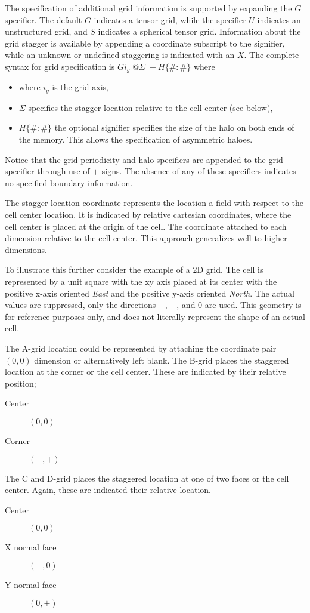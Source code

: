 The specification of additional grid information is supported by expanding the $G$ specifier. The default $G$ indicates a tensor grid, while the specifier $U$ indicates an unstructured grid, and $S$ indicates a spherical tensor grid. Information about the grid stagger is available by appending a coordinate subscript to the signifier, while an unknown or undefined staggering is indicated with an $X$.
The complete syntax for grid specification is $G i_g \; @ \Sigma \; + H \{ \# : \# \}$ where
\begin{itemize}
	\item where $i_g$ is the grid axis,
	\item $\Sigma$ specifies the stagger location relative to  the cell center (see below),
	\item $H \{ \# : \# \}$ the optional signifier specifies the size of the  halo on both ends of the memory. This allows the specification of asymmetric haloes.
\end{itemize}
Notice that the grid periodicity and halo specifiers are appended to the grid specifier through use of $+$ signs. The absence of any of these specifiers indicates no specified boundary information.

The stagger location coordinate represents the location a field with respect to the cell center location. It is indicated by relative cartesian coordinates, where the cell center is placed at the origin of the cell. The coordinate attached to each dimension relative to the cell center. This approach generalizes well to higher dimensions. 

To illustrate this further consider the example of a 2D grid. The cell is represented by a unit square with the xy axis placed at its center with the positive x-axis oriented {\em East} and the positive y-axis oriented {\em North}. The actual values are suppressed, only the directions $+$, $-$, and $0$ are used. This geometry is for reference purposes only, and does not literally represent the shape of an actual cell. 

The A-grid location could be represented by attaching the coordinate pair $(0,0)$ dimension or alternatively left blank. The B-grid places the staggered location at the corner or the cell center. These are indicated by their relative position;
\begin{description}
	\item [Center] $(0,0)$
	\item [Corner] $(+,+)$
\end{description}  
The C and D-grid places the staggered location at one of two faces or the cell center. Again, these are indicated their relative location.
\begin{description}
	\item [Center] $(0,0)$
	\item [X normal face] $(+,0)$
	\item [Y normal face] $(0,+)$
\end{description}  

